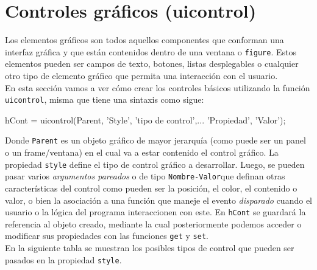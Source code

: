 \section{Controles gráficos (uicontrol)}

Los elementos gráficos son todos aquellos componentes que conforman una
interfaz gráfica y que están contenidos dentro de una ventana o
\texttt{figure}. Estos elementos pueden ser campos de texto, botones,
listas desplegables o cualquier otro tipo de elemento gráfico que
permita una interacción con el usuario. \\

En esta sección vamos a ver cómo crear los controles básicos utilizando
la función \texttt{uicontrol}, misma que tiene una sintaxis como sigue:

\begin{matlab}
hCont = uicontrol(Parent, 'Style', 'tipo de control',...
                  'Propiedad', 'Valor');
\end{matlab}

Donde \texttt{Parent} es un objeto gráfico de mayor jerarquía (como
puede ser un panel o un frame/ventana) en el cual va a estar contenido
el control gráfico. La propiedad \texttt{style} define el tipo de
control gráfico a desarrollar. Luego, se pueden pasar varios
\emph{argumentos pareados} o de tipo \texttt{Nombre-Valor}que definan
otras características del control como pueden ser la posición, el color,
el contenido o valor, o bien la asociación a una función que maneje el
evento \emph{disparado} cuando el usuario o la lógica del programa
interaccionen con este. En \texttt{hCont} se guardará la referencia al
objeto creado, mediante la cual posteriormente podemos acceder o
modificar sus propiedades con las funciones \texttt{get} y \texttt{set}. \\ 

En la siguiente tabla se muestran los posibles tipos de control que
pueden ser pasados en la propiedad \texttt{style}.

